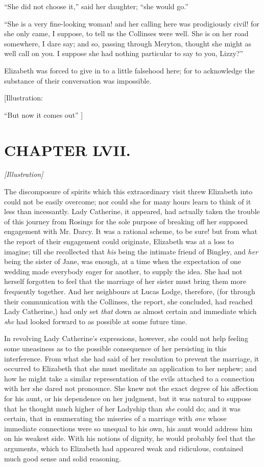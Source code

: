 \documentclass[12pt]{book}
\begin{document}
``She did not choose it,'' said her daughter; ``she would go.''

``She is a very fine-looking woman! and her calling here was prodigiously civil! for she only came, I suppose, to tell us the Collinses were well. She is on her road somewhere, I dare say; and so, passing through Meryton, thought she might as well call on you. I suppose she had nothing particular to say to you, Lizzy?''

Elizabeth was forced to give in to a little falsehood here; for to acknowledge the substance of their conversation was impossible.

[Illustration:

``But now it comes out'' ]

\chapter{CHAPTER LVII.}

\emph{[Illustration]}

The discomposure of spirits which this extraordinary visit threw Elizabeth into could not be easily overcome; nor could she for many hours learn to think of it less than incessantly. Lady Catherine, it appeared, had actually taken the trouble of this journey from Rosings for the sole purpose of breaking off her supposed engagement with Mr. Darcy. It was a rational scheme, to be sure! but from what the report of their engagement could originate, Elizabeth was at a loss to imagine; till she recollected that \textit{his} being the intimate friend of Bingley, and \textit{her} being the sister of Jane, was enough, at a time when the expectation of one wedding made everybody eager for another, to supply the idea. She had not herself forgotten to feel that the marriage of her sister must bring them more frequently together. And her neighbours at Lucas Lodge, therefore, (for through their communication with the Collinses, the report, she concluded, had reached Lady Catherine,) had only set \textit{that} down as almost certain and immediate which \textit{she} had looked forward to as possible at some future time.

In revolving Lady Catherine's expressions, however, she could not help feeling some uneasiness as to the possible consequence of her persisting in this interference. From what she had said of her resolution to prevent the marriage, it occurred to Elizabeth that she must meditate an application to her nephew; and how he might take a similar representation of the evils attached to a connection with her she dared not pronounce. She knew not the exact degree of his affection for his aunt, or his dependence on her judgment, but it was natural to suppose that he thought much higher of her Ladyship than \textit{she} could do; and it was certain, that in enumerating the miseries of a marriage with \textit{one} whose immediate connections were so unequal to his own, his aunt would address him on his weakest side. With his notions of dignity, he would probably feel that the arguments, which to Elizabeth had appeared weak and ridiculous, contained much good sense and solid reasoning.
\end{document}
